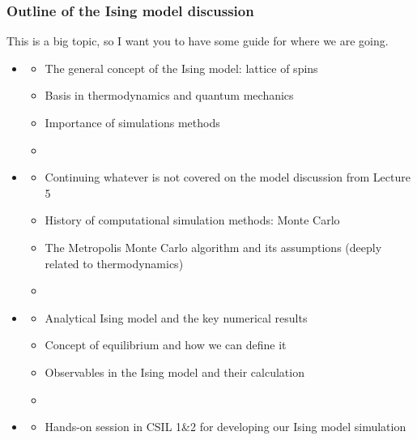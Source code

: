 \documentclass[hyperref={colorlinks=true}]{beamer}
\begin{document}
\begin{frame}[shrink=10]
  \frametitle{Outline of the Ising model discussion}

  This is a big topic, so I want you to have some guide for where we are going.
  
  \begin{itemize}
    \item {}
    \begin{itemize}
      \item The general concept of the Ising model: lattice of spins
      \item Basis in thermodynamics and quantum mechanics
      \item Importance of simulations methods
      \item {}
    \end{itemize}
    \item {}
    \begin{itemize}
      \item Continuing whatever is not covered on the model discussion from Lecture 5
      \item History of computational simulation methods: Monte Carlo
      \item The Metropolis Monte Carlo algorithm and its assumptions (deeply related to thermodynamics)
      \item {}
    \end{itemize}
    \item {}
    \begin{itemize}
      \item Analytical Ising model and the key numerical results
      \item Concept of equilibrium and how we can define it
      \item Observables in the Ising model and their calculation
      \item {}
    \end{itemize}
    \item {}
    \begin{itemize}
      \item Hands-on session in CSIL 1\&2 for developing our Ising model simulation
    \end{itemize}
  \end{itemize}

\end{frame}
\end{document}
